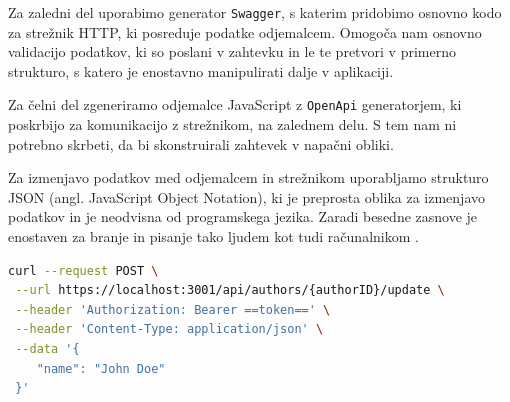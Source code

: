 \documentclass[a4paper, 12pt]{book}
\begin{document}
\clearpage
Za zaledni del uporabimo generator \verb=Swagger=, s katerim pridobimo osnovno kodo za strežnik HTTP, ki posreduje podatke odjemalcem. Omogoča nam osnovno validacijo podatkov, ki so poslani v zahtevku in le te pretvori v primerno strukturo, s katero je enostavno manipulirati dalje v aplikaciji. 

Za čelni del zgeneriramo odjemalce JavaScript z \verb=OpenApi= generatorjem, ki poskrbijo za komunikacijo z strežnikom, na zalednem delu. S tem nam ni potrebno skrbeti, da bi skonstruirali zahtevek v napačni obliki.


Za izmenjavo podatkov med odjemalcem in strežnikom uporabljamo strukturo JSON (angl. JavaScript Object Notation), ki je preprosta oblika za izmenjavo podatkov in je neodvisna od programskega jezika. Zaradi besedne zasnove je enostaven za branje in pisanje tako ljudem kot tudi računalnikom \cite{json-rfc}.

\begin{lstlisting}[language=bash, style=mystyle,caption={Primer izvedbe API klica in odgovora},label=lst:api-call-example]
 curl --request POST \
 --url https://localhost:3001/api/authors/{authorID}/update \
 --header 'Authorization: Bearer ==token==' \
 --header 'Content-Type: application/json' \
 --data '{
    "name": "John Doe"
 }'
\end{lstlisting}
\end{document}
